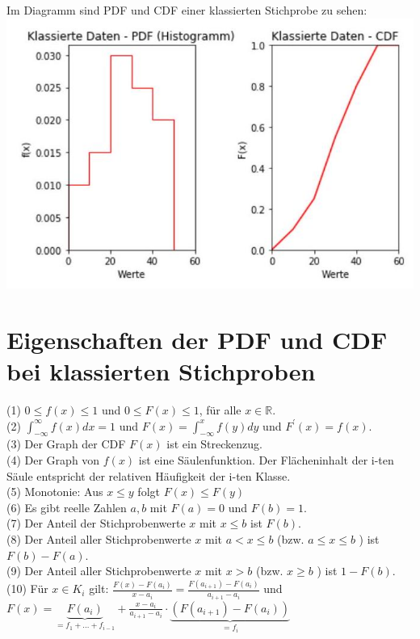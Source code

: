 \documentclass[10pt]{article}
\begin{document}
Im Diagramm sind PDF und CDF einer klassierten Stichprobe zu sehen:\\
\includegraphics[width=\linewidth]{images/2025_01_02_7223f4748d9c61c6ce42g-3}

\section*{Eigenschaften der PDF und CDF bei klassierten Stichproben}
(1) $0 \leq f(x) \leq 1$ und $0 \leq F(x) \leq 1$, für alle $x \in \mathbb{R}$.\\
(2) $\int_{-\infty}^{\infty} f(x) d x=1$ und $F(x)=\int_{-\infty}^{x} f(y) d y$ und $F^{\prime}(x)=f(x)$.\\
(3) Der Graph der CDF $F(x)$ ist ein Streckenzug.\\
(4) Der Graph von $f(x)$ ist eine Säulenfunktion. Der Flächeninhalt der i-ten Säule entspricht der relativen Häufigkeit der i-ten Klasse.\\
(5) Monotonie: Aus $x \leq y$ folgt $F(x) \leq F(y)$\\
(6) Es gibt reelle Zahlen $a, b$ mit $F(a)=0$ und $F(b)=1$.\\
(7) Der Anteil der Stichprobenwerte $x$ mit $x \leq b$ ist $F(b)$.\\
(8) Der Anteil aller Stichprobenwerte $x$ mit $a<x \leq b$ (bzw. $a \leq x \leq b$ ) ist $F(b)-F(a)$.\\
(9) Der Anteil aller Stichprobenwerte $x$ mit $x>b$ (bzw. $x \geq b$ ) ist $1-F(b)$.\\
(10) Für $x \in K_{i}$ gilt: $\frac{F(x)-F\left(a_{i}\right)}{x-a_{i}}=\frac{F\left(a_{i+1}\right)-F\left(a_{i}\right)}{a_{i+1}-a_{i}}$ und $F(x)=\underbrace{F\left(a_{i}\right)}_{=f_{1}+\ldots+f_{i-1}}+\frac{x-a_{i}}{a_{i+1}-a_{i}} \cdot \underbrace{\left(F\left(a_{i+1}\right)-F\left(a_{i}\right)\right)}_{=f_{i}}$
\end{document}
